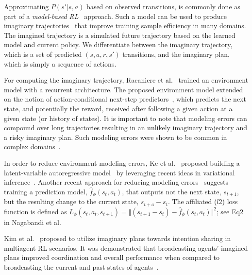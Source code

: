 \documentclass{article}
\begin{document}
        Approximating $P(s'|s,a)$ based on observed transitions, is commonly done as part of a \textit{model-based RL}~\cite{kaiser2019model,xu2020prediction} approach. Such a model can be used to produce imaginary trajectories~\cite{racaniere2017imagination} that improve training sample efficiency in many domains. The imagined trajectory is a simulated future trajectory based on the learned model and current policy. We differentiate between the imaginary trajectory, which is a set of predicted $(s,a,r,s')$ transitions, and the imaginary plan, which is simply a sequence of actions.

        For computing the imaginary trajectory, Racaniere et al.~\citeyear{racaniere2017imagination} trained an environment model with a recurrent architecture. The proposed environment model extended on the notion of action-conditional next-step predictors~\cite{oh2015action,chiappa2017recurrent,leibfried2017deep}, which predicts the next state, and potentially the reward, received after following a given action at a given state (or history of states).
        It is important to note that modeling errors can compound over long trajectories resulting in an unlikely imaginary trajectory and a risky imaginary plan. Such modeling errors were shown to be common in complex domains~\cite{talvitie2014model,talvitie2015agnostic}.

        In order to reduce environment modeling errors, Ke et al.~\citeyear{ke2018modeling} proposed building a latent-variable autoregressive model~\cite{gulrajani2016pixelvae} by leveraging recent ideas in variational inference~\cite{zhang2018advances}. Another recent approach for reducing modeling errors~\cite{nagabandi2018neural} suggests training a prediction model, $\hat{f}_\phi(s_t, a_t)$, that outputs not the next state, $s_{t+1}$, but the resulting change to the current state, $s_{t+a}-s_t$. The affiliated ($l2$) loss function is defined as $L_\phi(s_t,a_t,s_{t+1})=\Vert (s_{t+1}-s_t) -  \hat{f}_\phi(s_t, a_t) \Vert ^2$; see Eq2 in Nagabandi et al.

        Kim et al.~\citeyear{kim2020communication} proposed to utilize imaginary plans towards intention sharing in multiagent RL scenarios. It was demonstrated that broadcasting agents' imagined plans improved coordination and overall performance when compared to broadcasting the current and past states of agents~\cite{foerster2016learning,sukhbaatar2016learning,jiang2018learning,das2019tarmac}.  
\end{document}
